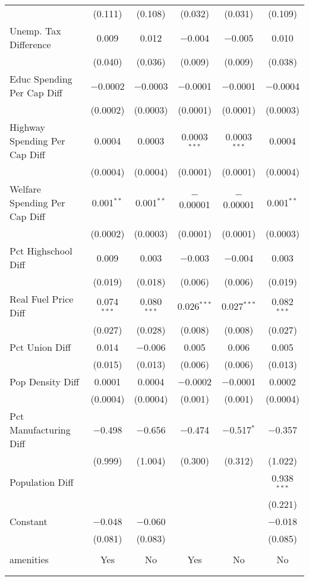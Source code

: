 \begin{table}[!htbp]
\begin{tabular}{@{\extracolsep{5pt}}lccccc}
  & (0.111) & (0.108) & (0.032) & (0.031) & (0.109) \\ 
  Unemp. Tax Difference & 0.009 & 0.012 & $-$0.004 & $-$0.005 & 0.010 \\ 
  & (0.040) & (0.036) & (0.009) & (0.009) & (0.038) \\ 
  Educ Spending Per Cap Diff & $-$0.0002 & $-$0.0003 & $-$0.0001 & $-$0.0001 & $-$0.0004 \\ 
  & (0.0002) & (0.0003) & (0.0001) & (0.0001) & (0.0003) \\ 
  Highway Spending Per Cap Diff & 0.0004 & 0.0003 & 0.0003$^{***}$ & 0.0003$^{***}$ & 0.0004 \\ 
  & (0.0004) & (0.0004) & (0.0001) & (0.0001) & (0.0004) \\ 
  Welfare Spending Per Cap Diff & 0.001$^{**}$ & 0.001$^{**}$ & $-$0.00001 & $-$0.00001 & 0.001$^{**}$ \\ 
  & (0.0002) & (0.0003) & (0.0001) & (0.0001) & (0.0003) \\ 
  Pct Highschool Diff & 0.009 & 0.003 & $-$0.003 & $-$0.004 & 0.003 \\ 
  & (0.019) & (0.018) & (0.006) & (0.006) & (0.019) \\ 
  Real Fuel Price Diff & 0.074$^{***}$ & 0.080$^{***}$ & 0.026$^{***}$ & 0.027$^{***}$ & 0.082$^{***}$ \\ 
  & (0.027) & (0.028) & (0.008) & (0.008) & (0.027) \\ 
  Pct Union Diff & 0.014 & $-$0.006 & 0.005 & 0.006 & 0.005 \\ 
  & (0.015) & (0.013) & (0.006) & (0.006) & (0.013) \\ 
  Pop Density Diff & 0.0001 & 0.0004 & $-$0.0002 & $-$0.0001 & 0.0002 \\ 
  & (0.0004) & (0.0004) & (0.001) & (0.001) & (0.0004) \\ 
  Pct Manufacturing Diff & $-$0.498 & $-$0.656 & $-$0.474 & $-$0.517$^{*}$ & $-$0.357 \\ 
  & (0.999) & (1.004) & (0.300) & (0.312) & (1.022) \\ 
  Population Diff &  &  &  &  & 0.938$^{***}$ \\ 
  &  &  &  &  & (0.221) \\ 
  Constant & $-$0.048 & $-$0.060 &  &  & $-$0.018 \\ 
  & (0.081) & (0.083) &  &  & (0.085) \\ 
 \hline \\[-1.8ex] 
amenities & Yes & No & Yes & No & No \\ 
\hline \\[-1.8ex] 
\hline 
\hline \\[-1.8ex] 
\end{tabular} 
\end{table} 
